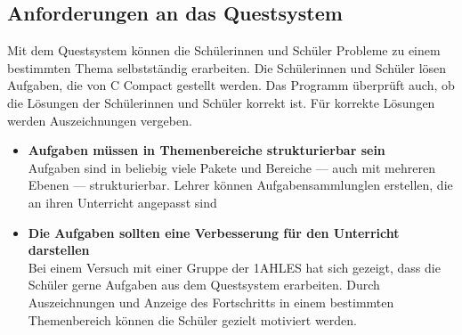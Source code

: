 \subsection*{Anforderungen an das Questsystem}
Mit dem Questsystem können die Schülerinnen und Schüler Probleme zu einem bestimmten Thema selbstständig erarbeiten. Die Schülerinnen und Schüler lösen Aufgaben, die von C Compact gestellt werden. Das Programm überprüft auch, ob die Lösungen der Schülerinnen und Schüler korrekt ist. Für korrekte Lösungen werden Auszeichnungen vergeben.
\begin{itemize}
\item \textbf{Aufgaben müssen in Themenbereiche strukturierbar sein}\\
Aufgaben sind in beliebig viele Pakete und Bereiche --- auch mit mehreren Ebenen --- strukturierbar. Lehrer können Aufgabensammlunglen erstellen, die an ihren Unterricht angepasst sind
\item \textbf{Die Aufgaben sollten eine Verbesserung für den Unterricht darstellen}\\
Bei einem Versuch mit einer Gruppe der 1AHLES hat sich gezeigt, dass die Schüler gerne Aufgaben aus dem Questsystem erarbeiten. Durch Auszeichnungen und Anzeige des Fortschritts in einem bestimmten Themenbereich können die Schüler gezielt motiviert werden.
\end{itemize}